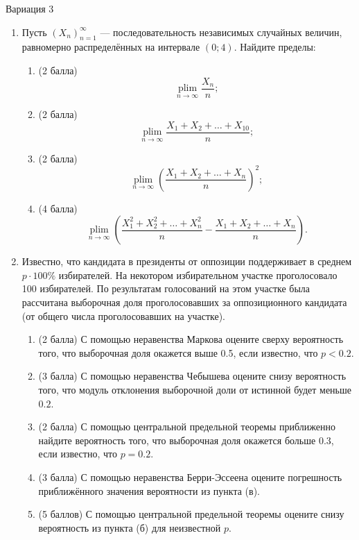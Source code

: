 \documentclass[12pt]{article}
\DeclareMathOperator*{\plim}{plim}
\begin{document}
\newpage


Вариация 3

\begin{enumerate}
\item Пусть $(X_n)_{n=1}^{\infty}$ — последовательность независимых случайных величин, равномерно распределённых на интервале $(0; 4)$. 
Найдите пределы:

\begin{enumerate}
    \item (2 балла) 
    \[
        \plim\limits_{n\to\infty} \frac{X_n}{n};
    \]
    \item (2 балла) 
    \[ 
        \plim\limits_{n\to\infty} \frac{X_1 + X_2 + \ldots + X_{10}}{n};
    \]
    \item (2 балла) 
    \[
         \plim\limits_{n\to\infty} \left(\frac{X_1 + X_2 + \ldots + X_n}{n}\right)^2;
         \]
    
    \item (4 балла) 
    \[
         \plim\limits_{n\to\infty} \left(\frac{X_1^2 + X_2^2 + \ldots + X_{n}^2}{n} - \frac{X_1 + X_2 + \ldots + X_{n}}{n}\right).
         \]
\end{enumerate}

\item Известно, что кандидата в президенты от оппозиции поддерживает в среднем $p\cdot 100\%$ избирателей. 
На некотором избирательном участке проголосовало 100 избирателей. 
По результатам голосований на этом участке была рассчитана выборочная доля проголосовавших 
за оппозиционного кандидата (от общего числа проголосовавших на участке).

\begin{enumerate}
    \item (2 балла) С помощью неравенства Маркова оцените сверху вероятность того, 
    что выборочная доля окажется выше 0.5, если известно, что $p<0.2$.
    \item (3 балла) С помощью неравенства Чебышева оцените снизу вероятность того, 
    что модуль отклонения выборочной доли от истинной будет меньше $0.2$.
    \item (2 балла) С помощью центральной предельной теоремы приближенно найдите вероятность того, 
    что выборочная доля окажется больше 0.3, если известно, что $p=0.2$.
    \item (3 балла) С помощью неравенства Берри-Эссеена оцените погрешность приближённого значения вероятности из пункта (в).
    \item (5 баллов) С помощью центральной предельной теоремы оцените снизу вероятность из пункта (б) для неизвестной $p$.
\end{enumerate}

\end{enumerate}
\end{document}
